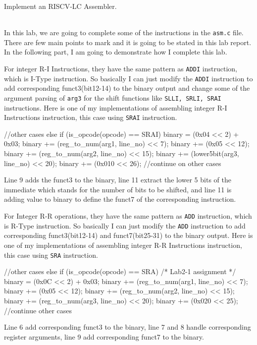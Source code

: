 \documentclass[12pt, a4paper]{article}
\begin{document}
\begin{qNoMark}
Implement an RISCV-LC Assembler. 
\end{qNoMark}

\begin{ans}
\\\indent In this lab, we are going to complete some of the instructions in the \texttt{asm.c} file. 
There are few main points to mark and it is going to be stated in this lab report. 
In the following part, I am going to demonstrate how I complete this lab. 

For integer R-I Instructions, they have the same pattern as \texttt{ADDI} instruction, which is I-Type instruction. 
So basically I can just modify the \texttt{ADDI} instruction to add corresponding funct3(bit12-14) to the binary output and 
change some of the argument parsing of \texttt{arg3} for the shift functions like \texttt{SLLI, SRLI, SRAI} instructions. Here 
is one of my implementations of assembling integer R-I Instructions instruction, this case using \texttt{SRAI} instruction. 
\begin{code}
//other cases
else if (is_opcode(opcode) == SRAI) {
    binary = (0x04 << 2) + 0x03;
    binary += (reg_to_num(arg1, line_no) << 7);
    binary += (0x05 << 12);
    binary += (reg_to_num(arg2, line_no) << 15);
    binary += (lower5bit(arg3, line_no) << 20);
    binary += (0x010 << 26);
}
//continue on other cases
\end{code}
Line 9 adds the funct3 to the binary, line 11 extract the lower 5 bits of the immediate which stands for the number of bits to be 
shifted, and line 11 is adding value to binary to define the funct7 of the corresponding instruction. 

For Integer R-R operations, they have the same pattern as \texttt{ADD} instruction, which is R-Type instruction. 
So basically I can just modify the \texttt{ADD} instruction to add corresponding funct3(bit12-14) and funct7(bit25-31) to the binary output. 
Here is one of my implementations of assembling integer R-R Instructions instruction, this case using \texttt{SRA} instruction. 
\begin{code}
//other cases
else if (is_opcode(opcode) == SRA) {
    /* Lab2-1 assignment */
    binary = (0x0C << 2) + 0x03;
    binary += (reg_to_num(arg1, line_no) << 7);
    binary += (0x05 << 12);
    binary += (reg_to_num(arg2, line_no) << 15);
    binary += (reg_to_num(arg3, line_no) << 20);
    binary += (0x020 << 25);
}
//continue other cases
\end{code}
Line 6 add corresponding funct3 to the binary, line 7 and 8 handle corresponding register arguments, line 9 add corresponding funct7 to the binary. 
\pagebreak


\end{ans}
\end{document}
